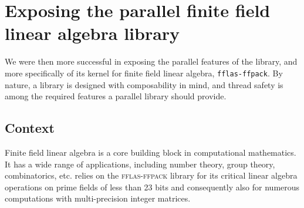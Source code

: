 \documentclass{deliverablereport}
\author{Alexis Breust, Karim Belabas, Jean-Guillaume Dumas, Jeroen Demeyer, William B. Hart, Steve Linton, Clément Pernet, Hongguang Zhu}
\newcommand{\fflasffpack}{\textsc{fflas-ffpack}\xspace}
\begin{document}
\maketitle
\githubissuedescription


\tableofcontents



\section{Exposing the parallel finite field linear algebra library \Linbox}

We were then more successful in exposing the parallel features of the \Linbox
library, and more specifically of its kernel for finite field linear algebra,
\texttt{fflas-ffpack}. By nature, a library is designed with composability in
mind, and thread safety is among the required features a parallel library should
provide.

\subsection{Context}

Finite field linear algebra is a core building block in computational mathematics.
It has a wide range of applications, including number theory, group theory, combinatorics, etc. \SageMath relies on the
\fflasffpack library for its critical linear algebra operations on prime fields of less than 23 bits and consequently
also for numerous computations with multi-precision integer matrices.  
\end{document}
